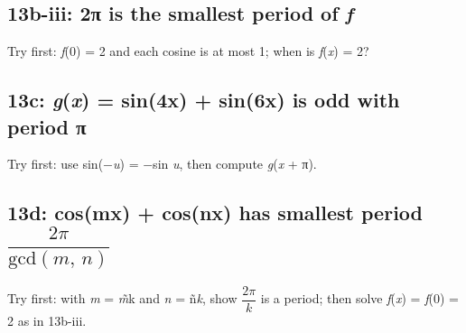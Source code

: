 \documentclass[11pt]{article}
\begin{document}
\begin{keepsection}
\begin{keepsection}
\end{keepsection}

\begin{keepsection}
\subsection{13b-iii: 2π is the smallest period of \textit{f}}

Try first: \textit{f}(0) = 2 and each cosine is at most 1; when is \textit{f}(\textit{x}) = 2?

\end{keepsection}

\begin{keepsection}
\subsection{13c: \textit{g}(\textit{x}) = sin(4x) + sin(6x) is odd with period π}

Try first: use sin(\ensuremath{-}\textit{u}) = \ensuremath{-}sin \textit{u}, then compute \textit{g}(\textit{x} + π).

\end{keepsection}

\begin{keepsection}
\subsection{13d: cos(mx) + cos(nx) has smallest period {\small\ensuremath{\dfrac{2π}{\text{gcd}({m},\, {n})}}}}

Try first: with \textit{m} = \textit{m}̃k and \textit{n} = ñ\textit{k}, show {\small\ensuremath{\dfrac{2π}{{k}}}} is a period; then solve \textit{f}(\textit{x}) = \textit{f}(0) = 2 as in 13b-iii.

\end{keepsection}

\begin{keepsection}

\end{keepsection}
\end{keepsection}
\end{document}
